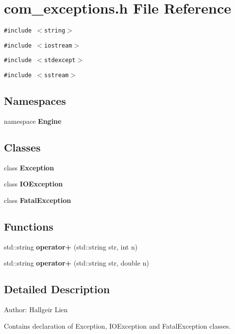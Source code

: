 \section{com\_\-exceptions.h File Reference}
\label{com__exceptions_8h}
{\tt \#include $<$string$>$}\par
{\tt \#include $<$iostream$>$}\par
{\tt \#include $<$stdexcept$>$}\par
{\tt \#include $<$sstream$>$}\par
\subsection*{Namespaces}
\begin{CompactItemize}
\item 
namespace {\bf Engine}
\end{CompactItemize}
\subsection*{Classes}
\begin{CompactItemize}
\item 
class {\bf Exception}
\item 
class {\bf IOException}
\item 
class {\bf FatalException}
\end{CompactItemize}
\subsection*{Functions}
\begin{CompactItemize}
\item 
std::string {\bf operator+} (std::string str, int n)
\item 
std::string {\bf operator+} (std::string str, double n)
\end{CompactItemize}


\subsection{Detailed Description}
\begin{Desc}
\item[Author:]Hallgeir Lien\end{Desc}
Contains declaration of Exception, IOException and FatalException classes. 